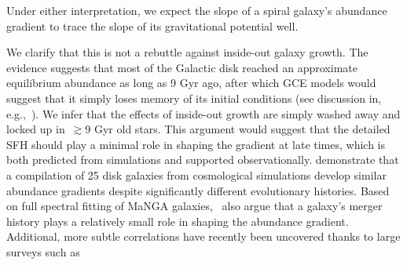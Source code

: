 Under either interpretation, we expect the slope of a spiral galaxy's
abundance gradient to trace the slope of its gravitational potential well.
\par
We clarify that this is not a rebuttle against inside-out galaxy growth.
The evidence suggests that most of the Galactic disk reached an approximate
equilibrium abundance as long as 9 Gyr ago, after which GCE models would
suggest that it simply loses memory of its initial conditions (see discussion
in, e.g.,~\citealt{Weinberg2017b}).
We infer that the effects of inside-out growth are simply washed away and
locked up in~$\gtrsim$9 Gyr old stars.
This argument would suggest that the detailed SFH should play a minimal role
in shaping the gradient at late times, which is both predicted from simulations
and supported observationally.
\citet{Pilkington2012} demonstrate that a compilation of 25 disk galaxies from
cosmological simulations develop similar abundance gradients despite
significantly different evolutionary histories.
Based on full spectral fitting of MaNGA galaxies,~\citet{Goddard2017} also
argue that a galaxy's merger history plays a relatively small role in shaping
the abundance gradient.
Additional, more subtle correlations have recently been uncovered thanks to
large surveys such as~\gaia~\citep{GaiaCollaboration}

